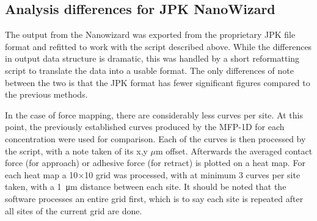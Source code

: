\subsection{Analysis differences for JPK NanoWizard} %

The output from the Nanowizard was exported from the proprietary JPK file format and refitted to work with the script described above. While the differences in output data structure is dramatic, this was handled by a short reformatting script to translate the data into a usable format. The only differences of note between the two is that the JPK format has fewer significant figures compared to the previous methods.

In the case of force mapping, there are considerably less curves per site. At this point, the previously established curves produced by the MFP-1D for each concentration were used for comparison. Each of the curves is then processed by the script, with a note taken of its x,y $\mu$m offset. Afterwards the averaged contact force (for approach) or adhesive force (for retract) is plotted on a heat map. For each heat map a 10$\times$10 grid was processed, with at minimum 3 curves per site taken, with a \SI{1}{\micro\metre} distance between each site. It should be noted that the software processes an entire grid first, which is to say each site is repeated after all sites of the current grid are done.









